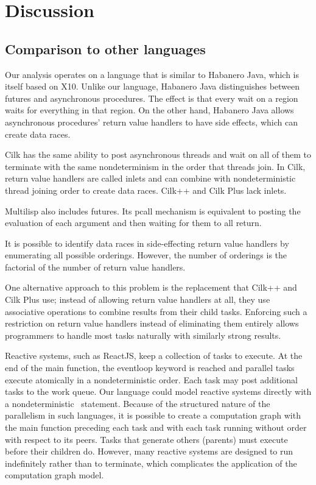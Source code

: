 \section{Discussion}
\label{sec:discussion}

\subsection{Comparison to other languages}

Our analysis operates on a language that is similar to Habanero Java,
which is itself based on X10. Unlike our language, Habanero Java
distinguishes between futures and asynchronous procedures. The effect
is that every wait on a region waits for everything in that region. On
the other hand, Habanero Java allows asynchronous procedures' return
value handlers to have side effects, which can create data races.

Cilk has the same ability to post asynchronous threads and wait on all
of them to terminate with the same nondeterminism in the order that
threads join. In Cilk, return value handlers are called inlets and can
combine with nondeterministic thread joining order to create data
races. Cilk++ and Cilk Plus lack inlets.

Multilisp also includes futures. Its pcall mechanism is equivalent to
posting the evaluation of each argument and then waiting for them to
all return.

It is possible to identify data races in side-effecting return value
handlers by enumerating all possible orderings. However, the number of
orderings is the factorial of the number of return value handlers.

One alternative approach to this problem is the replacement that
Cilk++ and Cilk Plus use; instead of allowing return value handlers at
all, they use associative operations to combine results from their
child tasks. Enforcing such a restriction on return value handlers
instead of eliminating them entirely allows programmers to handle
most tasks naturally with similarly strong results.

Reactive systems, such as ReactJS, keep a collection of tasks to
execute. At the end of the main function, the eventloop keyword is
reached and parallel tasks execute atomically in a nondeterministic
order. Each task may post additional tasks to the work queue. Our
language could model reactive systems directly with a nondeterministic
\post\ statement. Because of the structured nature of the parallelism
in such languages, it is possible to create a computation graph with
the main function preceding each task and with each task running
without order with respect to its peers. Tasks that generate others
(parents) must execute before their children do. However, many
reactive systems are designed to run indefinitely rather than to
terminate, which complicates the application of the computation graph
model.

